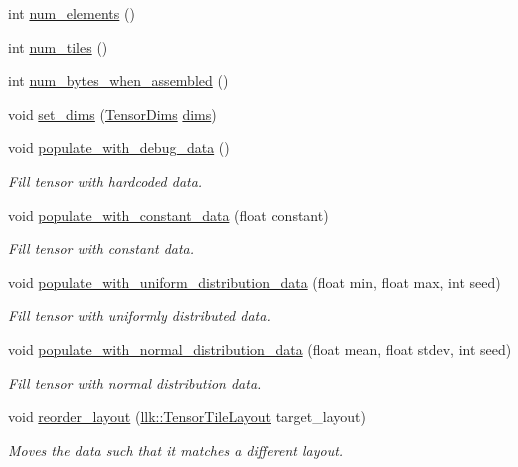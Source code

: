 \begin{DoxyCompactItemize}
\item 
int \hyperlink{classllk_1_1Tensor_ac55215da369eabacb7d0cd1b29d8ddab}{num\+\_\+elements} ()
\item 
int \hyperlink{classllk_1_1Tensor_acdc903190eb313866087785894a61291}{num\+\_\+tiles} ()
\item 
int \hyperlink{classllk_1_1Tensor_a021595eb6c130bffd81edfb4b39435db}{num\+\_\+bytes\+\_\+when\+\_\+assembled} ()
\item 
void \hyperlink{classllk_1_1Tensor_a17cbdfbb10299e9e9f920731376446ad}{set\+\_\+dims} (\hyperlink{structllk_1_1TensorDims}{Tensor\+Dims} \hyperlink{classllk_1_1Tensor_a6bad1b600bb823472f1aa770d3bbc173}{dims})
\item 
void \hyperlink{classllk_1_1Tensor_a6a90c8c3dae1a5e576cfc96f34586b09}{populate\+\_\+with\+\_\+debug\+\_\+data} ()
\begin{DoxyCompactList}\small\item\em Fill tensor with hardcoded data. \end{DoxyCompactList}\item 
void \hyperlink{classllk_1_1Tensor_aae7598dbef0652a4a12ee34fadc6996b}{populate\+\_\+with\+\_\+constant\+\_\+data} (float constant)
\begin{DoxyCompactList}\small\item\em Fill tensor with constant data. \end{DoxyCompactList}\item 
void \hyperlink{classllk_1_1Tensor_a72f5408bc201d59f4967169dad10b369}{populate\+\_\+with\+\_\+uniform\+\_\+distribution\+\_\+data} (float min, float max, int seed)
\begin{DoxyCompactList}\small\item\em Fill tensor with uniformly distributed data. \end{DoxyCompactList}\item 
void \hyperlink{classllk_1_1Tensor_a725baaf587a492ea43ff53356cc35fc0}{populate\+\_\+with\+\_\+normal\+\_\+distribution\+\_\+data} (float mean, float stdev, int seed)
\begin{DoxyCompactList}\small\item\em Fill tensor with normal distribution data. \end{DoxyCompactList}\item 
void \hyperlink{classllk_1_1Tensor_a17f312473d97c8786e6449236b4adf17}{reorder\+\_\+layout} (\hyperlink{namespacellk_a1cb439631a4f96e1431eea4d9b1f5cdb}{llk\+::\+Tensor\+Tile\+Layout} target\+\_\+layout)
\begin{DoxyCompactList}\small\item\em Moves the data such that it matches a different layout. \end{DoxyCompactList}\item 

\end{DoxyCompactItemize}
